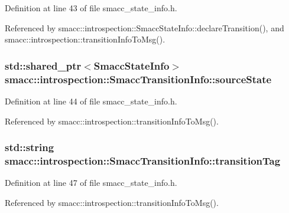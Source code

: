 Definition at line 43 of file smacc\+\_\+state\+\_\+info.\+h.



Referenced by smacc\+::introspection\+::\+Smacc\+State\+Info\+::declare\+Transition(), and smacc\+::introspection\+::transition\+Info\+To\+Msg().

\subsubsection[{\texorpdfstring{source\+State}{sourceState}}]{\setlength{\rightskip}{0pt plus 5cm}std\+::shared\+\_\+ptr$<${\bf Smacc\+State\+Info}$>$ smacc\+::introspection\+::\+Smacc\+Transition\+Info\+::source\+State}\hypertarget{structsmacc_1_1introspection_1_1SmaccTransitionInfo_aa44f16d098eb91ed222008fe0abf1275}{}\label{structsmacc_1_1introspection_1_1SmaccTransitionInfo_aa44f16d098eb91ed222008fe0abf1275}


Definition at line 44 of file smacc\+\_\+state\+\_\+info.\+h.



Referenced by smacc\+::introspection\+::transition\+Info\+To\+Msg().

\subsubsection[{\texorpdfstring{transition\+Tag}{transitionTag}}]{\setlength{\rightskip}{0pt plus 5cm}std\+::string smacc\+::introspection\+::\+Smacc\+Transition\+Info\+::transition\+Tag}\hypertarget{structsmacc_1_1introspection_1_1SmaccTransitionInfo_aece8c6af9a682232a435ca1d92b953bd}{}\label{structsmacc_1_1introspection_1_1SmaccTransitionInfo_aece8c6af9a682232a435ca1d92b953bd}


Definition at line 47 of file smacc\+\_\+state\+\_\+info.\+h.



Referenced by smacc\+::introspection\+::transition\+Info\+To\+Msg().

